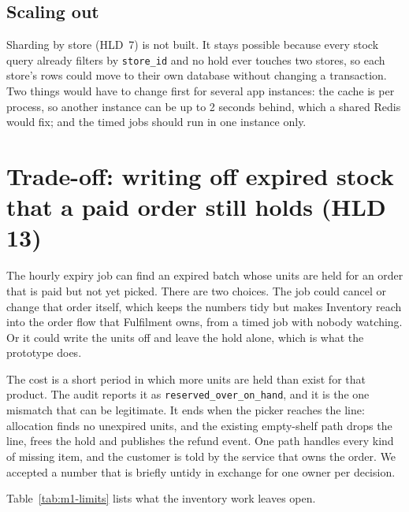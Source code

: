 \subsection{Scaling out}

Sharding by store (HLD~7) is not built. It stays possible because every stock query already filters by
\texttt{store\_id} and no hold ever touches two stores, so each store's rows could move to their own database
without changing a transaction. Two things would have to change first for several app instances: the cache is per
process, so another instance can be up to 2 seconds behind, which a shared Redis would fix; and the timed jobs
should run in one instance only.

\section{Trade-off: writing off expired stock that a paid order still holds (HLD 13)}
\label{sec:m1-tradeoff}

The hourly expiry job can find an expired batch whose units are held for an order that is paid but not yet picked.
There are two choices. The job could cancel or change that order itself, which keeps the numbers tidy but makes
Inventory reach into the order flow that Fulfilment owns, from a timed job with nobody watching. Or it could write
the units off and leave the hold alone, which is what the prototype does.

The cost is a short period in which more units are held than exist for that product. The audit reports it as
\texttt{reserved\_over\_on\_hand}, and it is the one mismatch that can be legitimate. It ends when the picker reaches
the line: allocation finds no unexpired units, and the existing empty-shelf path drops the line, frees the hold and
publishes the refund event. One path handles every kind of missing item, and the customer is told by the service
that owns the order. We accepted a number that is briefly untidy in exchange for one owner per decision.

Table~\ref{tab:m1-limits} lists what the inventory work leaves open.

